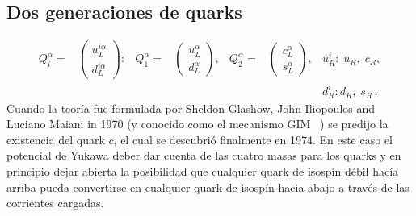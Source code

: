 \subsection{Dos generaciones de quarks}


\begin{align}
  Q_i^\alpha=&
\begin{pmatrix}
  u^{i\alpha}_L\\
  d^{i\alpha}_L
\end{pmatrix}:&
  Q_1^\alpha=&
  \begin{pmatrix}
    u^\alpha_L\\
    d^\alpha_L
  \end{pmatrix},&  Q_2^\alpha=&
  \begin{pmatrix}
    c^\alpha_L\\
    s^\alpha_L
  \end{pmatrix},& u_R^i:\;u_R,\;c_R,\nonumber\\
&&&&&&d_R^i:d_R,\;s_R\,.
\end{align}
Cuando la teoría fue formulada por Sheldon Glashow, John Iliopoulos and Luciano Maiani in 1970 (y conocido como el mecanismo GIM~\cite{} ) se predijo la existencia del quark $c$, el cual se descubrió finalmente en 1974. En este caso el potencial de Yukawa deber dar cuenta de las cuatro masas para los quarks y en principio dejar abierta la
posibilidad que cualquier quark de isospín débil hacía arriba pueda convertirse en cualquier quark de isospín hacia abajo a través de las corrientes cargadas.

